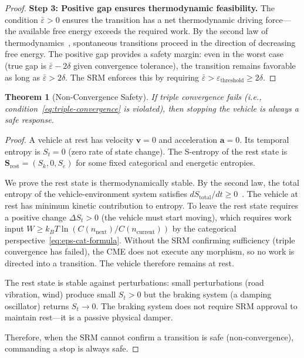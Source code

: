 \documentclass[twocolumn,10pt]{article}
\newtheorem{theorem}{Theorem}[section]
\theoremstyle{definition}
\newcommand{\Sentropy}{\mathbf{S}}
\newcommand{\Sk}{S_k}
\newcommand{\St}{S_t}
\newcommand{\Se}{S_e}
\begin{document}
\begin{proof}
\textbf{Step 3: Positive gap ensures thermodynamic feasibility.} The condition $\bar{\varepsilon} > 0$ ensures the transition has a net thermodynamic driving force---the available free energy exceeds the required work. By the second law of thermodynamics~\cite{boltzmann1896}, spontaneous transitions proceed in the direction of decreasing free energy. The positive gap provides a safety margin: even in the worst case (true gap is $\bar{\varepsilon} - 2\delta$ given convergence tolerance), the transition remains favorable as long as $\bar{\varepsilon} > 2\delta$. The SRM enforces this by requiring $\bar{\varepsilon} > \varepsilon_{\mathrm{threshold}} \geq 2\delta$.
\end{proof}

\begin{theorem}[Non-Convergence Safety]
\label{thm:non-convergence}
If triple convergence fails (i.e., condition~\eqref{eq:triple-convergence} is violated), then stopping the vehicle is always a safe response.
\end{theorem}

\begin{proof}
A vehicle at rest has velocity $\mathbf{v} = 0$ and acceleration $\mathbf{a} = 0$. Its temporal entropy is $\St = 0$ (zero rate of state change). The S-entropy of the rest state is $\Sentropy_{\mathrm{rest}} = (\Sk, 0, \Se)$ for some fixed categorical and energetic entropies.

We prove the rest state is thermodynamically stable. By the second law, the total entropy of the vehicle-environment system satisfies $dS_{\mathrm{total}}/dt \geq 0$~\cite{boltzmann1896}. The vehicle at rest has minimum kinetic contribution to entropy. To leave the rest state requires a positive change $\Delta \St > 0$ (the vehicle must start moving), which requires work input $W \geq k_B T \ln(C(n_{\mathrm{next}})/C(n_{\mathrm{current}}))$ by the categorical perspective~\eqref{eq:eps-cat-formula}. Without the SRM confirming sufficiency (triple convergence has failed), the CME does not execute any morphism, so no work is directed into a transition. The vehicle therefore remains at rest.

The rest state is stable against perturbations: small perturbations (road vibration, wind) produce small $\St > 0$ but the braking system (a damping oscillator) returns $\St \to 0$. The braking system does not require SRM approval to maintain rest---it is a passive physical damper.

Therefore, when the SRM cannot confirm a transition is safe (non-convergence), commanding a stop is always safe.
\end{proof}
\end{document}
